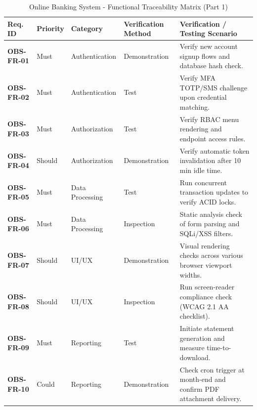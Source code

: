 \documentclass[11pt,a4paper]{article}
\begin{document}
\begin{table}[H]
\centering
\caption{Online Banking System - Functional Traceability Matrix (Part 1)}
\label{tab:functional_rtm_1}
\footnotesize
\singlespacing
\begin{tabular}{p{2.0cm} p{1.4cm} p{2.6cm} p{2.6cm} p{4.8cm}}
\toprule
\textbf{Req. ID} & \textbf{Priority} & \textbf{Category} & \textbf{Verification Method} & \textbf{Verification / Testing Scenario} \\ \midrule
\textbf{OBS-FR-01} & Must & Authentication & Demonstration & Verify new account signup flows and database hash check. \\ \midrule
\textbf{OBS-FR-02} & Must & Authentication & Test & Verify MFA TOTP/SMS challenge upon credential matching. \\ \midrule
\textbf{OBS-FR-03} & Must & Authorization & Test & Verify RBAC menu rendering and endpoint access rules. \\ \midrule
\textbf{OBS-FR-04} & Should & Authorization & Demonstration & Verify automatic token invalidation after 10 min idle time. \\ \midrule
\textbf{OBS-FR-05} & Must & Data Processing & Test & Run concurrent transaction updates to verify ACID locks. \\ \midrule
\textbf{OBS-FR-06} & Must & Data Processing & Inspection & Static analysis check of form parsing and SQLi/XSS filters. \\ \midrule
\textbf{OBS-FR-07} & Should & UI/UX & Demonstration & Visual rendering checks across various browser viewport widths. \\ \midrule
\textbf{OBS-FR-08} & Should & UI/UX & Inspection & Run screen-reader compliance check (WCAG 2.1 AA checklist). \\ \midrule
\textbf{OBS-FR-09} & Must & Reporting & Test & Initiate statement generation and measure time-to-download. \\ \midrule
\textbf{OBS-FR-10} & Could & Reporting & Demonstration & Check cron trigger at month-end and confirm PDF attachment delivery. \\ \bottomrule
\end{tabular}
\end{table}

\newpage
\end{document}
